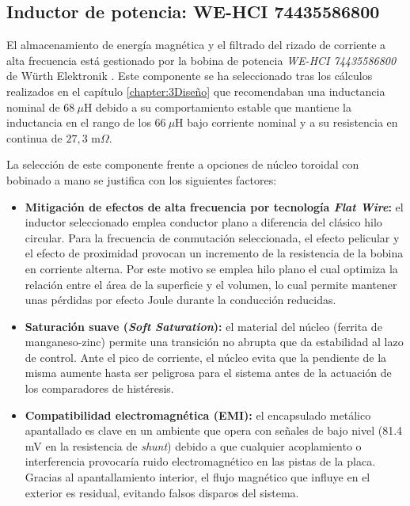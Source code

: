 \documentclass[12pt]{report} %
\begin{document}
\subsection{Inductor de potencia: WE-HCI 74435586800}
El almacenamiento de energía magnética y el filtrado del rizado de corriente a alta frecuencia está gestionado por la bobina de potencia \textit{WE-HCI 74435586800} de Würth Elektronik \cite{wurth_elektronik_74435586800_nodate}. Este componente se ha seleccionado tras los cálculos realizados en el capítulo \ref{chapter:3Diseño} que recomendaban una inductancia nominal de $68\ \mu\text{H}$ debido a su comportamiento estable que mantiene la inductancia en el rango de los $66\ \mu\text{H}$ bajo corriente nominal y a su resistencia en continua de $27{,}3\text{ m}\Omega$.

La selección de este componente frente a opciones de núcleo toroidal con bobinado a mano se justifica con los siguientes factores:
\begin{itemize}
    \item \textbf{Mitigación de efectos de alta frecuencia por tecnología \textit{Flat Wire}:} el inductor seleccionado emplea conductor plano a diferencia del clásico hilo circular. Para la frecuencia de conmutación seleccionada, el efecto pelicular \cite{noauthor_efecto_nodate-1} y el efecto de proximidad \cite{javier_fernandez_de_sevilla_galan_perdidas_2019} provocan un incremento de la resistencia de la bobina en corriente alterna. Por este motivo se emplea hilo plano el cual optimiza la relación entre el área de la superficie y el volumen, lo cual permite mantener unas pérdidas por efecto Joule durante la conducción reducidas. 
    \item \textbf{Saturación suave (\textit{Soft Saturation}):} el material del núcleo (ferrita de manganeso-zinc) permite una transición no abrupta que da estabilidad al lazo de control. Ante el pico de corriente, el núcleo evita que la pendiente de la misma aumente hasta ser peligrosa para el sistema antes de la actuación de los comparadores de histéresis. 
    \item \textbf{Compatibilidad electromagnética (EMI):} el encapsulado metálico apantallado es clave en un ambiente que opera con señales de bajo nivel (81.4 mV en la resistencia de \textit{shunt}) debido a que cualquier acoplamiento o interferencia provocaría ruido electromagnético en las pistas de la placa. Gracias al apantallamiento interior, el flujo magnético que influye en el exterior es residual, evitando falsos disparos del sistema. 
\end{itemize}
\end{document}
